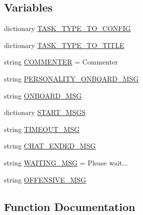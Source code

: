 \subsection*{Variables}
\begin{DoxyCompactItemize}
\item 
dictionary \hyperlink{namespacepersonality__captions_1_1worlds_ae9cf4d6b391399393f31771ecbeaff96}{T\+A\+S\+K\+\_\+\+T\+Y\+P\+E\+\_\+\+T\+O\+\_\+\+C\+O\+N\+F\+IG}
\item 
dictionary \hyperlink{namespacepersonality__captions_1_1worlds_a2698f345309f95991cc6d6e5d4ae1937}{T\+A\+S\+K\+\_\+\+T\+Y\+P\+E\+\_\+\+T\+O\+\_\+\+T\+I\+T\+LE}
\item 
string \hyperlink{namespacepersonality__captions_1_1worlds_a116a8ecbe9a208d52db1f2721e8bc5c3}{C\+O\+M\+M\+E\+N\+T\+ER} = \textquotesingle{}Commenter\textquotesingle{}
\item 
string \hyperlink{namespacepersonality__captions_1_1worlds_acbc1c1685e745a35076e4e967af4f375}{P\+E\+R\+S\+O\+N\+A\+L\+I\+T\+Y\+\_\+\+O\+N\+B\+O\+A\+R\+D\+\_\+\+M\+SG}
\item 
string \hyperlink{namespacepersonality__captions_1_1worlds_a8d1b5414b6aaf085cd603488d45a1a67}{O\+N\+B\+O\+A\+R\+D\+\_\+\+M\+SG}
\item 
dictionary \hyperlink{namespacepersonality__captions_1_1worlds_ae252c0c2ec5ecf39c1e79ff1b7736c93}{S\+T\+A\+R\+T\+\_\+\+M\+S\+GS}
\item 
string \hyperlink{namespacepersonality__captions_1_1worlds_a50dcd4a955597ad028296fdaa78c9217}{T\+I\+M\+E\+O\+U\+T\+\_\+\+M\+SG}
\item 
string \hyperlink{namespacepersonality__captions_1_1worlds_a2c1871523ae91d2b9938c26326eb2ae1}{C\+H\+A\+T\+\_\+\+E\+N\+D\+E\+D\+\_\+\+M\+SG}
\item 
string \hyperlink{namespacepersonality__captions_1_1worlds_a94a4e951873f385b27b9d372e295774f}{W\+A\+I\+T\+I\+N\+G\+\_\+\+M\+SG} = \textquotesingle{}Please wait...\textquotesingle{}
\item 
string \hyperlink{namespacepersonality__captions_1_1worlds_a212493dbb463ab37f495b8d85421d240}{O\+F\+F\+E\+N\+S\+I\+V\+E\+\_\+\+M\+SG}
\end{DoxyCompactItemize}


\subsection{Function Documentation}
\mbox{\label{namespacepersonality__captions_1_1worlds_a2863737d97a8e8c5a1ebe9029d0d2293}} 
